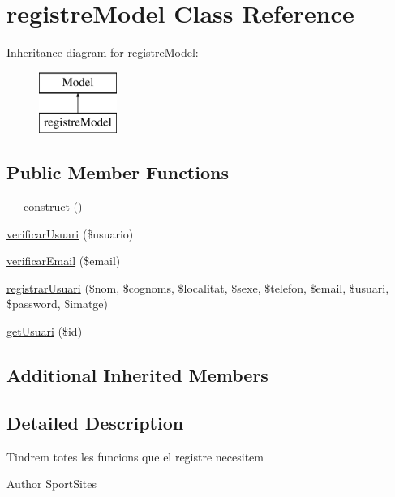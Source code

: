 \hypertarget{classregistre_model}{}\section{registre\+Model Class Reference}
\label{classregistre_model}
Inheritance diagram for registre\+Model\+:\begin{figure}[H]
\begin{center}
\leavevmode
\includegraphics[height=2.000000cm]{classregistre_model}
\end{center}
\end{figure}
\subsection*{Public Member Functions}
\begin{DoxyCompactItemize}
\item 
\hyperlink{classregistre_model_a095c5d389db211932136b53f25f39685}{\+\_\+\+\_\+construct} ()
\item 
\hyperlink{classregistre_model_a1af08156eb58a181ddd6a10fca8ec72f}{verificar\+Usuari} (\$usuario)
\item 
\hyperlink{classregistre_model_a761f49dd7b8c281badea7d096c0175fa}{verificar\+Email} (\$email)
\item 
\hyperlink{classregistre_model_acd3e4dc38a1c6b43654b8b7281235373}{registrar\+Usuari} (\$nom, \$cognoms, \$localitat, \$sexe, \$telefon, \$email, \$usuari, \$password, \$imatge)
\item 
\hyperlink{classregistre_model_ac9149067cf9637bfa353a5da3d053126}{get\+Usuari} (\$id)
\end{DoxyCompactItemize}
\subsection*{Additional Inherited Members}


\subsection{Detailed Description}
Tindrem totes les funcions que el registre necesitem

\begin{DoxyAuthor}{Author}
Sport\+Sites 
\end{DoxyAuthor}

